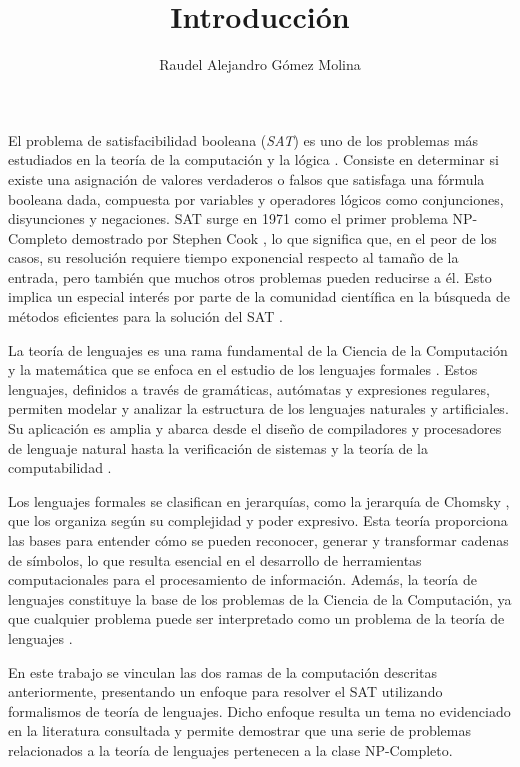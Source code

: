 \documentclass[12pt]{article}
\title{Introducción}
\author{Raudel Alejandro Gómez Molina}
\begin{document}
\maketitle

El problema de satisfacibilidad booleana (\textit{SAT}) \cite{authomataTheory} es uno de los problemas más estudiados en 
la teoría de la computación y la lógica \cite{biere2021handbook}.  Consiste en determinar si existe una asignación 
de valores verdaderos o falsos que satisfaga una fórmula booleana dada, compuesta por variables y operadores 
lógicos como conjunciones, disyunciones y negaciones. SAT surge en 1971 como el primer problema NP-Completo 
demostrado por Stephen Cook \cite{Cook1971}, lo que significa que, en el peor de los casos, su resolución 
requiere tiempo exponencial respecto al tamaño de la entrada, pero también que muchos otros problemas pueden 
reducirse a él. Esto implica un especial interés por parte de la comunidad científica en la búsqueda de 
métodos eficientes para la solución del SAT \cite{biere2021handbook}.

La teoría de lenguajes es una rama fundamental de la Ciencia de la Computación y la matemática que se enfoca 
en el estudio de los lenguajes formales \cite{authomataTheory}. Estos lenguajes, definidos a través de 
gramáticas, autómatas y expresiones regulares, permiten modelar y analizar la estructura de los lenguajes 
naturales y artificiales. Su aplicación es amplia y abarca desde el diseño de compiladores y procesadores de 
lenguaje natural hasta la verificación de sistemas y la teoría de la computabilidad \cite{authomataTheory}.

Los lenguajes formales se clasifican en jerarquías, como la jerarquía de Chomsky \cite{hunter2020chomsky}, 
que los organiza según su complejidad y poder expresivo. Esta teoría proporciona las bases para 
entender cómo se pueden reconocer, generar y transformar cadenas de símbolos, lo que resulta esencial 
en el desarrollo de herramientas computacionales para el procesamiento de información. Además, 
la teoría de lenguajes constituye la base de los problemas de la Ciencia de la Computación, ya que 
cualquier problema puede ser interpretado como un problema de la teoría de lenguajes \cite{authomataTheory}.

En este trabajo se vinculan las dos ramas de la computación descritas anteriormente, presentando 
un enfoque para resolver el SAT utilizando formalismos de teoría de lenguajes. Dicho enfoque resulta un 
tema no evidenciado en la literatura consultada y permite demostrar que una serie de problemas 
relacionados a la teoría de lenguajes pertenecen a la clase NP-Completo.
\end{document}
